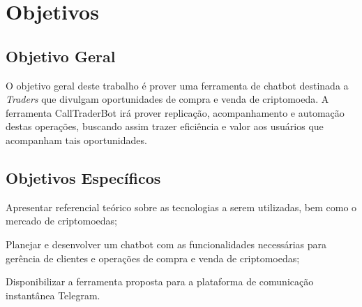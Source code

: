 



\section{Objetivos}
\subsection{Objetivo Geral}
O objetivo geral deste trabalho é prover uma ferramenta de chatbot destinada a \emph{Traders} que divulgam oportunidades de compra e venda de criptomoeda. A ferramenta CallTraderBot irá prover replicação, acompanhamento e automação destas operações, buscando assim trazer  eficiência e valor aos usuários que acompanham tais oportunidades.

\subsection{Objetivos Específicos}
\begin{lista}
  \item Apresentar referencial teórico sobre as tecnologias a serem utilizadas, bem como o mercado de criptomoedas;
  \item Planejar e desenvolver um chatbot com as funcionalidades necessárias para gerência de clientes e operações de compra e venda de criptomoedas;
  \item Disponibilizar a ferramenta proposta para a plataforma de comunicação instantânea Telegram.
\end{lista}

